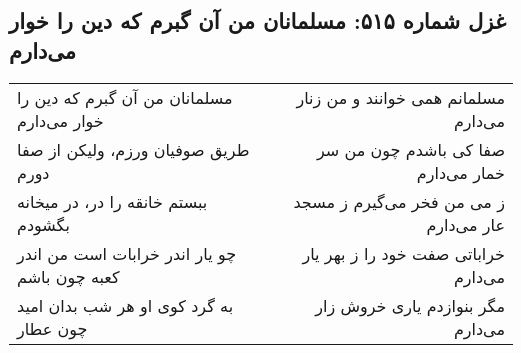 \begin{center}
\section*{غزل شماره ۵۱۵: مسلمانان من آن گبرم که دین را خوار می‌دارم}
\label{sec:515}
\begin{longtable}{l p{0.5cm} r}
مسلمانان من آن گبرم که دین را خوار می‌دارم
&&
مسلمانم همی خوانند و من زنار می‌دارم
\\
طریق صوفیان ورزم، ولیکن از صفا دورم
&&
صفا کی باشدم چون من سر خمار می‌دارم
\\
ببستم خانقه را در، در میخانه بگشودم
&&
ز می من فخر می‌گیرم ز مسجد عار می‌دارم
\\
چو یار اندر خرابات است من اندر کعبه چون باشم
&&
خراباتی صفت خود را ز بهر یار می‌دارم
\\
به گرد کوی او هر شب بدان امید چون عطار
&&
مگر بنوازدم یاری خروش زار می‌دارم
\\
\end{longtable}
\end{center}

